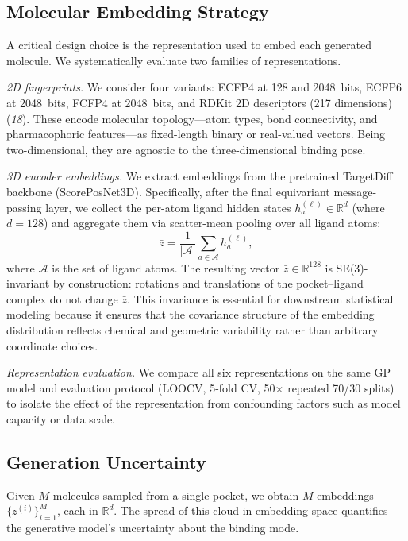 \documentclass{article}
\newcommand{\zbar}{\bar{z}}
\newcommand{\Rreal}{\mathbb{R}}
\newcommand{\scite}[1]{(\textit{#1})}
\begin{document}
\subsection{Molecular Embedding Strategy}

A critical design choice is the representation used to embed each
generated molecule.  We systematically evaluate two families of
representations.

\textit{2D fingerprints.}
We consider four variants: ECFP4 at 128 and 2048~bits, ECFP6 at
2048~bits, FCFP4 at 2048~bits, and RDKit 2D descriptors (217
dimensions) \scite{18}.  These encode molecular topology---atom types,
bond connectivity, and pharmacophoric features---as fixed-length binary
or real-valued vectors.  Being two-dimensional, they are agnostic to the
three-dimensional binding pose.

\textit{3D encoder embeddings.}
We extract embeddings from the pretrained TargetDiff backbone
(ScorePosNet3D).  Specifically, after the final equivariant message-passing
layer, we collect the per-atom ligand hidden states
$h_{a}^{(\ell)} \in \Rreal^{d}$ (where $d = 128$) and aggregate them
via scatter-mean pooling over all ligand atoms:
\begin{equation}
  \zbar = \frac{1}{|\mathcal{A}|}
           \sum_{a \in \mathcal{A}} h_{a}^{(\ell)},
  \label{eq:scatter_mean}
\end{equation}
where $\mathcal{A}$ is the set of ligand atoms.  The resulting vector
$\zbar \in \Rreal^{128}$ is SE(3)-invariant by construction: rotations
and translations of the pocket--ligand complex do not change $\zbar$.
This invariance is essential for downstream statistical modeling because
it ensures that the covariance structure of the embedding distribution
reflects chemical and geometric variability rather than arbitrary
coordinate choices.

\textit{Representation evaluation.}
We compare all six representations on the same GP model and evaluation
protocol (LOOCV, 5-fold CV, 50$\times$ repeated 70/30 splits) to
isolate the effect of the representation from confounding factors such as
model capacity or data scale.

\subsection{Generation Uncertainty}

Given $M$ molecules sampled from a single pocket, we obtain $M$
embeddings $\{z^{(i)}\}_{i=1}^{M}$, each in $\Rreal^{d}$.  The spread
of this cloud in embedding space quantifies the generative model's
uncertainty about the binding mode.
\end{document}
